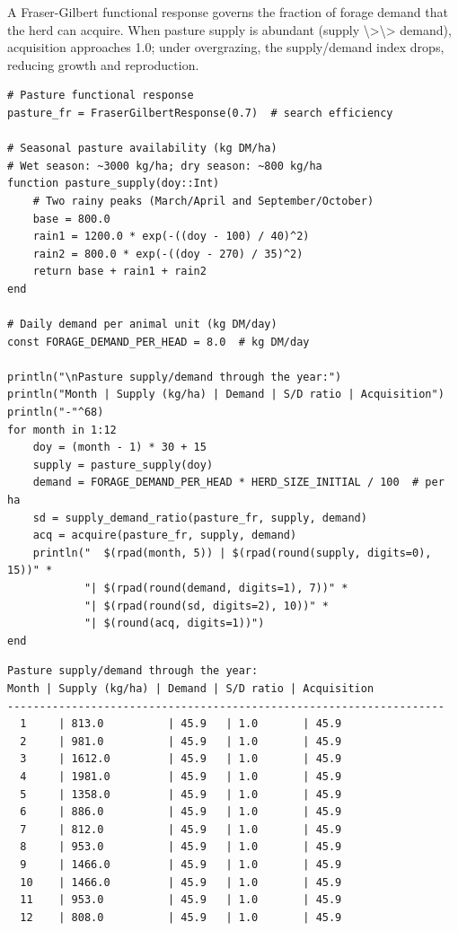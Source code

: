 \label{15517217595445811300}{}


A Fraser-Gilbert functional response governs the fraction of forage demand that the herd can acquire. When pasture supply is abundant (supply {\textbackslash}>{\textbackslash}> demand), acquisition approaches 1.0; under overgrazing, the supply/demand index drops, reducing growth and reproduction.




\begin{verbatim}
# Pasture functional response
pasture_fr = FraserGilbertResponse(0.7)  # search efficiency

# Seasonal pasture availability (kg DM/ha)
# Wet season: ~3000 kg/ha; dry season: ~800 kg/ha
function pasture_supply(doy::Int)
    # Two rainy peaks (March/April and September/October)
    base = 800.0
    rain1 = 1200.0 * exp(-((doy - 100) / 40)^2)
    rain2 = 800.0 * exp(-((doy - 270) / 35)^2)
    return base + rain1 + rain2
end

# Daily demand per animal unit (kg DM/day)
const FORAGE_DEMAND_PER_HEAD = 8.0  # kg DM/day

println("\nPasture supply/demand through the year:")
println("Month | Supply (kg/ha) | Demand | S/D ratio | Acquisition")
println("-"^68)
for month in 1:12
    doy = (month - 1) * 30 + 15
    supply = pasture_supply(doy)
    demand = FORAGE_DEMAND_PER_HEAD * HERD_SIZE_INITIAL / 100  # per ha
    sd = supply_demand_ratio(pasture_fr, supply, demand)
    acq = acquire(pasture_fr, supply, demand)
    println("  $(rpad(month, 5)) | $(rpad(round(supply, digits=0), 15))" *
            "| $(rpad(round(demand, digits=1), 7))" *
            "| $(rpad(round(sd, digits=2), 10))" *
            "| $(round(acq, digits=1))")
end
\end{verbatim}




\begin{verbatim}
Pasture supply/demand through the year:
Month | Supply (kg/ha) | Demand | S/D ratio | Acquisition
--------------------------------------------------------------------
  1     | 813.0          | 45.9   | 1.0       | 45.9
  2     | 981.0          | 45.9   | 1.0       | 45.9
  3     | 1612.0         | 45.9   | 1.0       | 45.9
  4     | 1981.0         | 45.9   | 1.0       | 45.9
  5     | 1358.0         | 45.9   | 1.0       | 45.9
  6     | 886.0          | 45.9   | 1.0       | 45.9
  7     | 812.0          | 45.9   | 1.0       | 45.9
  8     | 953.0          | 45.9   | 1.0       | 45.9
  9     | 1466.0         | 45.9   | 1.0       | 45.9
  10    | 1466.0         | 45.9   | 1.0       | 45.9
  11    | 953.0          | 45.9   | 1.0       | 45.9
  12    | 808.0          | 45.9   | 1.0       | 45.9
\end{verbatim}



